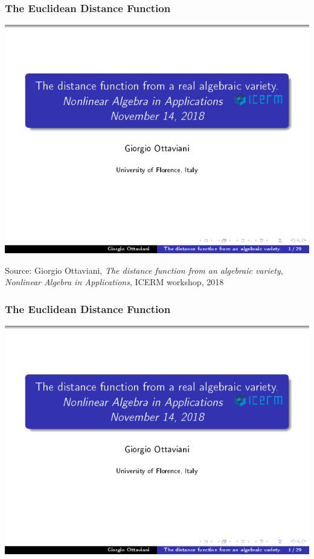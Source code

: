 \documentclass{beamer}
\begin{document}
\begin{frame}
\frametitle{The Euclidean Distance Function}
\includegraphics[page=3, clip, trim=0in 1in 0in 0in, width=\textwidth]{The_distance_function_from_a_real_algebraic_variety_]_Giorgio_Ottaviani,_University_of_Florence.pdf}
\begin{block}{}
Source: Giorgio Ottaviani, {\it The distance function from an algebraic variety}, {\it Nonlinear Algebra in Applications}, ICERM workshop, 2018
\end{block}
\end{frame}

\begin{frame}
\frametitle{The Euclidean Distance Function}
\includegraphics[page=7, clip, trim=0in 0in 0in 0in, width=\textwidth]{The_distance_function_from_a_real_algebraic_variety_]_Giorgio_Ottaviani,_University_of_Florence.pdf}
\end{frame}
\end{document}
